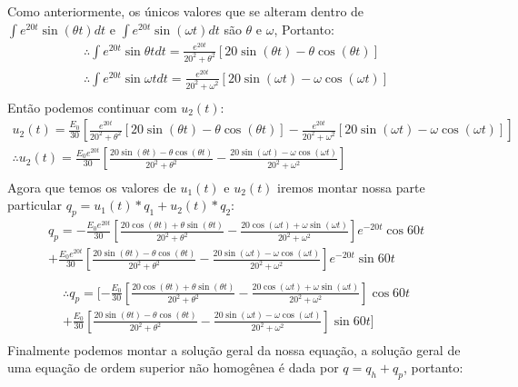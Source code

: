 \documentclass{abntex2}
\begin{document}
\newpage
\Large Como anteriormente, os únicos valores que se alteram dentro de ${\int}e^{20t}\sin{(\theta t)}dt$ e ${\int}e^{20t}\sin{(\omega t)}dt$ são $\theta$ e $\omega$, Portanto:
\begin{eqnarray*}
    \therefore {\int}e^{20t}\sin{\theta t}dt= \frac{e^{20t}}{20^2 +\theta^2}[20\sin{(\theta t)} - \theta\cos{(\theta t)}]\\
    \therefore {\int}e^{20t}\sin{\omega t}dt= \frac{e^{20t}}{20^2 +\omega^2}[20\sin{(\omega t)} - \omega\cos{(\omega t)}]\\
\end{eqnarray*}
\Large Então podemos continuar com $u_2(t)$:
\begin{eqnarray*}
    u_2(t) = \frac{E_0}{30}\left[\frac{e^{20t}}{20^2 +\theta^2}[20\sin{(\theta t)} - \theta\cos{(\theta t)}] - \frac{e^{20t}}{20^2 +\omega^2}[20\sin{(\omega t)} - \omega\cos{(\omega t)}]\right]\\
    \therefore u_2(t) = \frac{E_0{e^{20t}}}{30}\left[ \frac{ 20\sin{(\theta t)} -\theta\cos{(\theta t)}}{20^2 +\theta^2} - \frac{20\sin{(\omega t)} -\omega\cos{(\omega t)}}{20^2 +\omega^2} \right]\\
\end{eqnarray*}
\Large Agora que temos os valores de $u_1(t)$ e $u_2(t)$ iremos montar nossa parte particular $q_p = u_1(t)*q_1 + u_2(t)*q_2$:\\
\begin{eqnarray*}
    q_p = -\frac{E_0{e^{20t}}}{30}\left[ \frac{ 20\cos{(\theta t)} +\theta\sin{(\theta t)}}{20^2 +\theta^2} - \frac{20\cos{(\omega t)} +\omega\sin{(\omega t)}}{20^2 +\omega^2} \right]e^{-20t}\cos{60t} \\+ \frac{E_0{e^{20t}}}{30}\left[ \frac{ 20\sin{(\theta t)} -\theta\cos{(\theta t)}}{20^2 +\theta^2} - \frac{20\sin{(\omega t)} -\omega\cos{(\omega t)}}{20^2 +\omega^2} \right]e^{-20t}\sin{60t}\\
\end{eqnarray*}
\begin{eqnarray*}
    \therefore q_p = [-\frac{E_0}{30}\left[ \frac{ 20\cos{(\theta t)} +\theta\sin{(\theta t)}}{20^2 +\theta^2} - \frac{20\cos{(\omega t)} +\omega\sin{(\omega t)}}{20^2 +\omega^2}\right]\cos{60t} \\+ \frac{E_0}{30}\left[ \frac{ 20\sin{(\theta t)} -\theta\cos{(\theta t)}}{20^2 +\theta^2} - \frac{20\sin{(\omega t)} -\omega\cos{(\omega t)}}{20^2 +\omega^2} \right]\sin{60t}]\\
\end{eqnarray*}
\Large Finalmente podemos montar a solução geral da nossa equação, a solução geral de uma equação de ordem superior não homogênea é dada por $q = q_h + q_p$, portanto:\\
\end{document}
